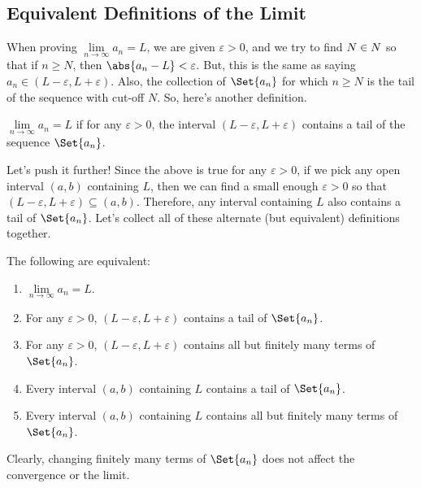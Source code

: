 \subsection*{Equivalent Definitions of the Limit}
When proving $ \lim\limits_{{n} \to {\infty}}a_n=L $, we are given $ \varepsilon>0 $, and we try to find $ N\in\relax{N} $
so that if $ n\ge N $, then $ \abs{a_n-L}<\varepsilon $. But, this is the same as saying
$ a_n\in (L-\varepsilon,L+\varepsilon) $. Also, the collection of $ \Set{a_n} $ for which
$ n\ge N $ is the tail of the sequence with cut-off $ N $. So, here's another definition.
\begin{Definition}{}{}
    $ \lim\limits_{{n} \to {\infty}}a_n=L $ if for any $ \varepsilon>0 $, the interval
    $ (L-\varepsilon,L+\varepsilon) $ contains a tail of the sequence $ \Set{a_n} $.
\end{Definition}
Let's push it further! Since the above is true for any $ \varepsilon>0 $, if we pick any
open interval $ (a,b) $ containing $ L $, then we can find a small enough $ \varepsilon>0 $
so that $ (L-\varepsilon,L+\varepsilon)\subseteq (a,b) $. Therefore, any interval containing
$ L $ also contains a tail of $ \Set{a_n} $. Let's collect all of these alternate (but equivalent) definitions together.
\begin{Theorem}{}{}
    The following are equivalent:
    \begin{enumerate}[(1)]
        \item $ \lim\limits_{{n} \to {\infty}}a_n=L $.
        \item For any $ \varepsilon>0 $, $ (L-\varepsilon,L+\varepsilon) $ contains a tail of $ \Set{a_n} $.
        \item For any $ \varepsilon>0 $, $ (L-\varepsilon,L+\varepsilon) $ contains all but finitely many terms of $ \Set{a_n} $.
        \item Every interval $ (a,b) $ containing $ L $ contains a tail of $ \Set{a_n} $.
        \item Every interval $ (a,b) $ containing $ L $ contains all but finitely many terms of $ \Set{a_n} $.
    \end{enumerate}
    Clearly, changing finitely many terms of $ \Set{a_n} $ does not affect the convergence or the limit.
\end{Theorem}
